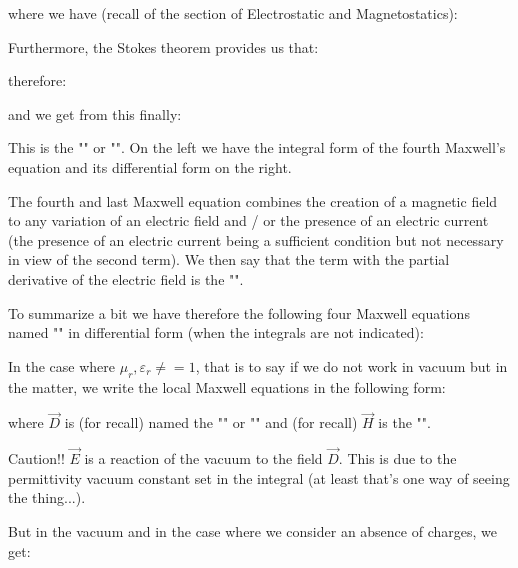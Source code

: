 	where we have (recall of the section of Electrostatic and Magnetostatics):
	
	Furthermore, the Stokes theorem provides us that:
	
	therefore:
	
	and we get from this finally:
	
	This is the "" or "". On the left we have the integral form of the fourth Maxwell's equation and its differential form on the right.
	
	The fourth and last Maxwell equation combines the creation of a magnetic field to any variation of an electric field and / or the presence of an electric current (the presence of an electric current being a sufficient condition but not necessary in view of the second term). We then say that the term with the partial derivative of the electric field is the "".
	
	To summarize a bit we have therefore the following four Maxwell equations named "" in differential form (when the integrals are not indicated):
	
	In the case where $\mu_r,\varepsilon_r\neq =1$, that is to say if we do not work in vacuum but in the matter, we write the local Maxwell equations in the following form:
	
	where $\vec{D}$ is (for recall) named the "" or "" and (for recall) $\vec{H}$ is the "".
	\begin{tcolorbox}[title=Remark,colframe=black,arc=10pt]
	Caution!! $\vec{E}$ is a reaction of the vacuum to the field $\vec{D}$. This is due to the permittivity vacuum constant  set in the integral (at least that's one way of seeing the thing...).
	\end{tcolorbox}
	
	But in the vacuum and in the case where we consider an absence of charges, we get:
	
